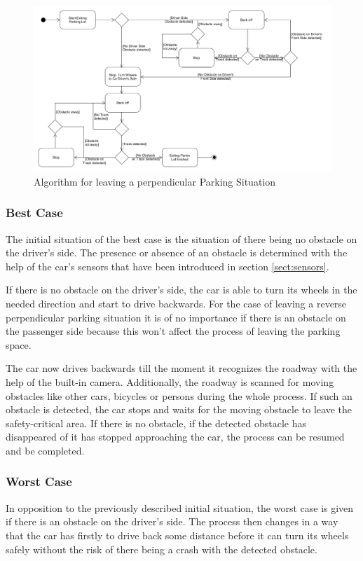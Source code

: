 \begin{figure}
\centering
\captionsetup{justification=centering}
\includegraphics[width=\textwidth]{res/systemAnalysis/ActivityObstacleTransversal.png}
\caption{Algorithm for leaving a perpendicular Parking Situation}
\label{fig:ActivityPerpendicular}
\end{figure}

\subsubsection{Best Case}
The initial situation of the best case is the situation of there being no
obstacle on the driver's side. The presence or absence of an obstacle is
determined with the help of the car's sensors that have been introduced in
section \ref{sect:sensors}.

If there is no obstacle on the driver's side, the car is able to turn its wheels
in the needed direction and start to drive backwards. For the case of leaving a
reverse perpendicular parking situation it is of no importance if there is an
obstacle on the passenger side because this won't affect the process of leaving
the parking space.

The car now drives backwards till the moment it recognizes the roadway with the
help of the built-in camera. Additionally, the roadway is scanned for moving
obstacles like other cars, bicycles or persons during the whole process. If such
an obstacle is detected, the car stops and waits for the moving obstacle to
leave the safety-critical area. If there is no obstacle, if the detected
obstacle has disappeared of it has stopped approaching the car, the process can
be resumed and be completed.


\subsubsection{Worst Case}
In opposition to the previously described initial situation, the worst case is
given if there is an obstacle on the driver's side. The process then changes in
a way that the car has firstly to drive back some distance before it can turn
its wheels safely without the risk of there being a crash with the detected
obstacle.

